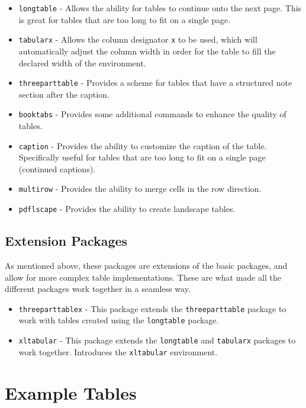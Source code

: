 \begin{itemize}
    \item \texttt{longtable} - Allows the ability for tables to continue onto the next page. This is great for tables that are too long to fit on a single page.
    \item \texttt{tabularx} - Allows the column designator \texttt{x} to be used, which will automatically adjust the column width in order for the table to fill the declared width of the environment.
    \item \texttt{threeparttable} - Provides a scheme for tables that have a structured note section after the caption.
    \item \texttt{booktabs} - Provides some additional commands to enhance the quality of tables.
    \item \texttt{caption} - Provides the ability to customize the caption of the table. Specifically useful for tables that are too long to fit on a single page (continued captions).
    \item \texttt{multirow} - Provides the ability to merge cells in the row direction.
    \item \texttt{pdflscape} - Provides the ability to create landscape tables.
\end{itemize}

\subsection{Extension Packages}
\label{sec: tables-extension-packages}

As mentioned above, these packages are extensions of the basic packages, and allow for more complex table implementations. These are what made all the different packages work together in a seamless way.

\begin{itemize}
    \item \texttt{threeparttablex} - This package extends the \texttt{threeparttable} package to work with tables created using the \texttt{longtable} package.
    \item \texttt{xltabular} - This package extends the \texttt{longtable} and \texttt{tabularx} packages to work together. Introduces the \texttt{xltabular} environment.
\end{itemize}

\section{Example Tables}
\label{sec: tables-example}

